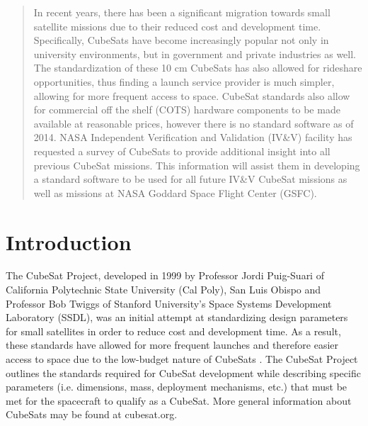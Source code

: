 \documentclass[11pt]{article}
\begin{document}
\maketitle

\begin{abstract}
In recent years, there has been a significant migration towards small satellite missions due to their reduced cost and development time.  Specifically, CubeSats have become increasingly popular not only in university environments, but in government and private industries as well.  The standardization of these 10 cm CubeSats has also allowed for rideshare opportunities, thus finding a launch service provider is much simpler, allowing for more frequent access to space.  CubeSat standards also allow for commercial off the shelf (COTS) hardware components to be made available at reasonable prices, however there is no standard software as of 2014.  NASA Independent Verification and Validation (IV\&V) facility has requested a survey of CubeSats to provide additional insight into all previous CubeSat missions.  This information will assist them in developing a standard software to be used for all future IV\&V CubeSat missions as well as missions at NASA Goddard Space Flight Center (GSFC).
\end{abstract}

\section{Introduction}
The CubeSat Project, developed in 1999 by Professor Jordi Puig-Suari of California Polytechnic State University (Cal Poly), San Luis Obispo and Professor Bob Twiggs of Stanford University's Space Systems Development Laboratory (SSDL), was an initial attempt at standardizing design parameters for small satellites in order to reduce cost and development time.  As a result, these standards have allowed for more frequent launches and therefore easier access to space due to the low-budget nature of CubeSats \cite{CalPoly}.  The CubeSat Project outlines the standards required for CubeSat development while describing specific parameters (i.e. dimensions, mass, deployment mechanisms, etc.) that must be met for the spacecraft to qualify as a CubeSat.  More general information about CubeSats may be found at cubesat.org.
\end{document}
